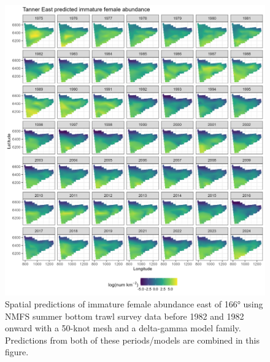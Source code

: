 \documentclass[
]{article}
\begin{document}
\begin{figure}

{\centering \includegraphics[width=1\linewidth,height=1\textheight]{../BAIRDI/Figures/TannerE_imfem_spatabund} 

}

\caption{Spatial predictions of immature female abundance east of 166° using NMFS summer bottom trawl survey data before 1982 and 1982 onward with a 50-knot mesh and a delta-gamma model family. Predictions from both of these periods/models are combined in this figure.}\label{fig:spatpred-abund-50-imfemE}
\end{figure}
\end{document}
